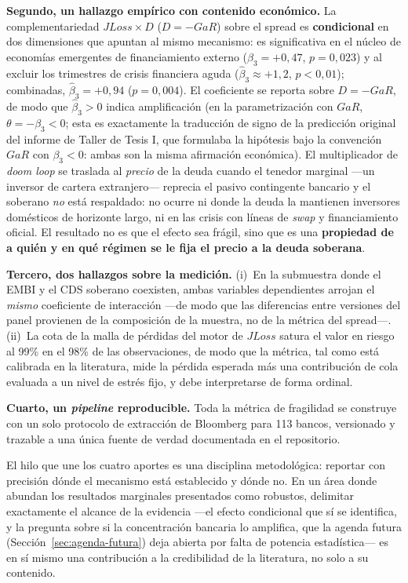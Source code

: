 \textbf{Segundo, un hallazgo empírico con contenido económico.} La complementariedad $JLoss\times D$ ($D=-GaR$) sobre el spread es \textbf{condicional} en dos dimensiones que apuntan al mismo mecanismo: es significativa en el núcleo de economías emergentes de financiamiento externo ($\hat\beta_3=+0{,}47$, $p=0{,}023$) y al excluir los trimestres de crisis financiera aguda ($\hat\beta_3\approx+1{,}2$, $p<0{,}01$); combinadas, $\hat\beta_3=+0{,}94$ ($p=0{,}004$). El coeficiente se reporta sobre $D=-GaR$, de modo que $\hat\beta_3>0$ indica amplificación (en la parametrización con $GaR$, $\theta=-\beta_3<0$; esta es exactamente la traducción de signo de la predicción original del informe de Taller de Tesis I, que formulaba la hipótesis bajo la convención $GaR$ con $\beta_3<0$: ambas son la misma afirmación económica). El multiplicador de \textit{doom loop} se traslada al \emph{precio} de la deuda cuando el tenedor marginal —un inversor de cartera extranjero— reprecia el pasivo contingente bancario y el soberano \emph{no} está respaldado: no ocurre ni donde la deuda la mantienen inversores domésticos de horizonte largo, ni en las crisis con líneas de \textit{swap} y financiamiento oficial. El resultado no es que el efecto sea frágil, sino que es una \textbf{propiedad de a quién y en qué régimen se le fija el precio a la deuda soberana}.

\textbf{Tercero, dos hallazgos sobre la medición.} (i)~En la submuestra donde el EMBI y el CDS soberano coexisten, ambas variables dependientes arrojan el \emph{mismo} coeficiente de interacción —de modo que las diferencias entre versiones del panel provienen de la composición de la muestra, no de la métrica del spread—. (ii)~La cota de la malla de pérdidas del motor de $JLoss$ satura el valor en riesgo al 99\% en el 98\% de las observaciones, de modo que la métrica, tal como está calibrada en la literatura, mide la pérdida esperada más una contribución de cola evaluada a un nivel de estrés fijo, y debe interpretarse de forma ordinal.

\textbf{Cuarto, un \textit{pipeline} reproducible.} Toda la métrica de fragilidad se construye con un solo protocolo de extracción de Bloomberg para 113 bancos, versionado y trazable a una única fuente de verdad documentada en el repositorio.

El hilo que une los cuatro aportes es una disciplina metodológica: reportar con precisión dónde el mecanismo está establecido y dónde no. En un área donde abundan los resultados marginales presentados como robustos, delimitar exactamente el alcance de la evidencia —el efecto condicional que sí se identifica, y la pregunta sobre si la concentración bancaria lo amplifica, que la agenda futura (Sección~\ref{sec:agenda-futura}) deja abierta por falta de potencia estadística— es en sí mismo una contribución a la credibilidad de la literatura, no solo a su contenido.

